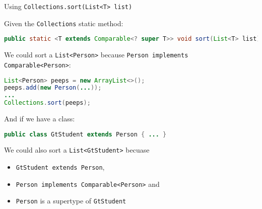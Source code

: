\documentclass{beamer}
\begin{document}
\begin{frame}[fragile]{Using {\tt Collections.sort(List<T> list)}}


Given the {\tt Collections} static method:
\begin{lstlisting}[language=Java]
public static <T extends Comparable<? super T>> void sort(List<T> list)
\end{lstlisting}

We could sort a {\tt List<Person>} because {\tt Person implements Comparable<Person>}:
\begin{lstlisting}[language=Java]
List<Person> peeps = new ArrayList<>();
peeps.add(new Person(...));
...
Collections.sort(peeps);
\end{lstlisting}
And if we have a class:
\begin{lstlisting}[language=Java]
public class GtStudent extends Person { ... }
\end{lstlisting}

We could also sort a {\tt List<GtStudent>} becuase
\begin{itemize}
\item {\tt GtStudent extends Person},
\item {\tt Person implements Comparable<Person>} and
\item {\tt Person} is a supertype of {\tt GtStudent}
\end{itemize}

\end{frame}
\end{document}
